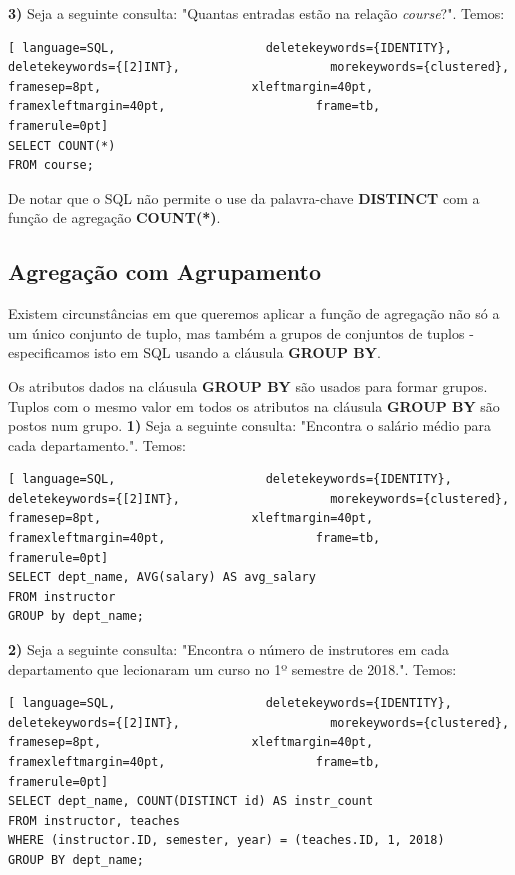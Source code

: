 \documentclass[oneside]{book}
\theoremstyle{definition}
\begin{document}
\textbf{3)} Seja a seguinte consulta: "Quantas entradas estão na relação \textit{course}?". Temos:
\begin{lstlisting}[ language=SQL,                     deletekeywords={IDENTITY},                     deletekeywords={[2]INT},                     morekeywords={clustered},                     framesep=8pt,                     xleftmargin=40pt,                     framexleftmargin=40pt,                     frame=tb,                     framerule=0pt]
SELECT COUNT(*)
FROM course;
\end{lstlisting}
De notar que o SQL não permite o use da palavra-chave \textbf{DISTINCT} com a função de agregação \textbf{COUNT(*)}.

\subsection{Agregação com Agrupamento}
Existem circunstâncias em que queremos aplicar a função de agregação não só a um único conjunto de tuplo, mas também a grupos de conjuntos de tuplos - especificamos isto em SQL usando a cláusula \textbf{GROUP BY}. 

Os atributos dados na cláusula \textbf{GROUP BY} são usados para formar grupos. Tuplos com o mesmo valor em todos os atributos na cláusula \textbf{GROUP BY} são postos num grupo.
\textbf{1)} Seja a seguinte consulta: "Encontra o salário médio para cada departamento.". Temos:
\begin{lstlisting}[ language=SQL,                     deletekeywords={IDENTITY},                     deletekeywords={[2]INT},                     morekeywords={clustered},                     framesep=8pt,                     xleftmargin=40pt,                     framexleftmargin=40pt,                     frame=tb,                     framerule=0pt]
SELECT dept_name, AVG(salary) AS avg_salary
FROM instructor
GROUP by dept_name;
\end{lstlisting}

\textbf{2)} Seja a seguinte consulta: "Encontra o número de instrutores em cada departamento que lecionaram um curso no 1º semestre de 2018.". Temos:
\begin{lstlisting}[ language=SQL,                     deletekeywords={IDENTITY},                     deletekeywords={[2]INT},                     morekeywords={clustered},                     framesep=8pt,                     xleftmargin=40pt,                     framexleftmargin=40pt,                     frame=tb,                     framerule=0pt]
SELECT dept_name, COUNT(DISTINCT id) AS instr_count
FROM instructor, teaches
WHERE (instructor.ID, semester, year) = (teaches.ID, 1, 2018)
GROUP BY dept_name;
\end{lstlisting}
\end{document}
